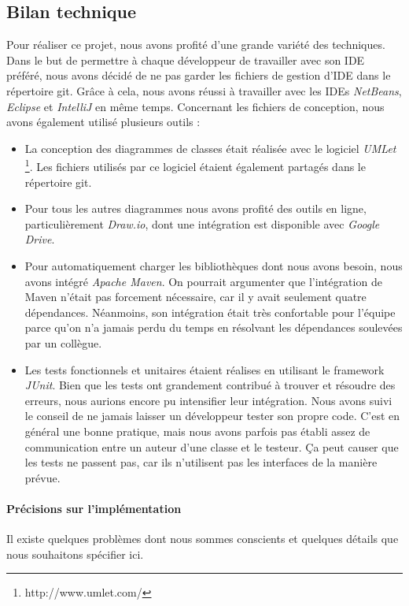 \documentclass[10pt,a4paper]{book}
\begin{document}
\subsection{Bilan technique}
Pour réaliser ce projet, nous avons profité d'une grande variété des techniques. Dans le but de permettre à chaque développeur de travailler avec son IDE préféré, nous avons décidé de ne pas garder les fichiers de gestion d'IDE dans le répertoire git. Grâce à cela, nous avons réussi à travailler avec les IDEs \textit{NetBeans}, \textit{Eclipse} et \textit{IntelliJ} en même temps. Concernant les fichiers de conception, nous avons également utilisé plusieurs outils :
\begin{itemize}
	\item{La conception des diagrammes de classes était réalisée avec le logiciel \textit{UMLet} \footnote{http://www.umlet.com/}. Les fichiers utilisés par ce logiciel étaient également partagés dans le répertoire git.}
	\item{Pour tous les autres diagrammes nous avons profité des outils en ligne, particulièrement \textit{Draw.io}, dont une intégration est disponible avec \textit{Google Drive}.}
	\item{Pour automatiquement charger les bibliothèques dont nous avons besoin, nous avons intégré \textit{Apache Maven}. On pourrait argumenter que l'intégration de Maven n'était pas forcement nécessaire, car il y avait seulement quatre dépendances. Néanmoins, son intégration était très confortable pour l'équipe parce qu'on n'a jamais perdu du temps en résolvant les dépendances soulevées par un collègue.}
	\item{Les tests fonctionnels et unitaires étaient réalises en utilisant le framework \textit{JUnit}. Bien que les tests ont grandement contribué à trouver et résoudre des erreurs, nous aurions encore pu intensifier leur intégration. Nous avons suivi le conseil de ne jamais laisser un développeur tester son propre code. C'est en général une bonne pratique, mais nous avons parfois pas établi assez de communication entre un auteur d'une classe et le testeur. Ça peut causer que les tests ne passent pas, car ils n'utilisent pas les interfaces de la manière prévue.}
\end{itemize}

\paragraph{Précisions sur l'implémentation}
Il existe quelques problèmes dont nous sommes conscients et quelques détails que nous souhaitons spécifier ici.
\end{document}

